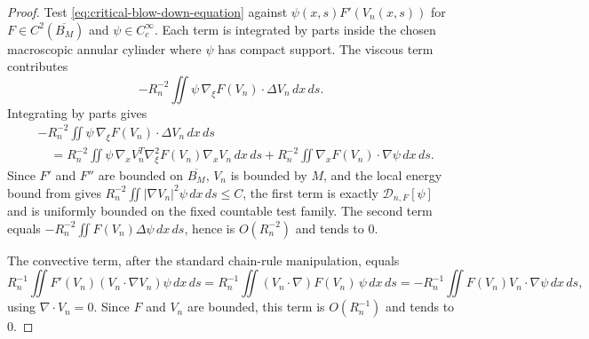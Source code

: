 \documentclass[11pt]{amsart}
\numberwithin{equation}{section}
\theoremstyle{plain}
\theoremstyle{definition}
\theoremstyle{remark}
\begin{document}
\begin{proof}
Test \eqref{eq:critical-blow-down-equation} against \(\psi(x,s)F'(V_n(x,s))\)
for \(F\in C^2(\overline{B_M})\) and \(\psi\in C_c^\infty\).  Each term is
integrated by parts inside the chosen macroscopic annular cylinder where
\(\psi\) has compact support.  The viscous term contributes
\[
   -R_n^{-2}\iint \psi\,\nabla_\xi F(V_n)\cdot\Delta V_n\,dx\,ds .
\]
Integrating by parts gives
\[
\begin{aligned}
&-R_n^{-2}\iint \psi\,\nabla_\xi F(V_n)\cdot\Delta V_n\,dx\,ds \\
&\quad =
R_n^{-2}\iint
\psi\,\nabla_xV_n^T\nabla_\xi^2F(V_n)\nabla_xV_n\,dx\,ds
+
R_n^{-2}\iint
\nabla_xF(V_n)\cdot\nabla\psi\,dx\,ds .
\end{aligned}
\]
Since \(F'\) and \(F''\) are bounded on \(\overline{B_M}\), \(V_n\) is bounded
by \(M\), and the local energy bound from
 gives \(R_n^{-2}\iint
|\nabla V_n|^2\psi\,dx\,ds\le C\), the first term is exactly
\(\mathscr D_{n,F}[\psi]\) and is uniformly bounded on the fixed countable test
family.  The second term equals
\(-R_n^{-2}\iint F(V_n)\Delta\psi\,dx\,ds\), hence is \(O(R_n^{-2})\) and
tends to \(0\).

The convective term, after the standard chain-rule manipulation, equals
\[
   R_n^{-1}\!\iint F'(V_n)(V_n\cdot\nabla V_n)\psi\,dx\,ds
   =R_n^{-1}\!\iint (V_n\cdot\nabla)F(V_n)\,\psi\,dx\,ds
   =-R_n^{-1}\!\iint F(V_n)V_n\cdot\nabla\psi\,dx\,ds ,
\]
using \(\nabla\cdot V_n=0\).  Since \(F\) and \(V_n\) are bounded, this term
is \(O(R_n^{-1})\) and tends to \(0\).


\end{proof}
\end{document}
